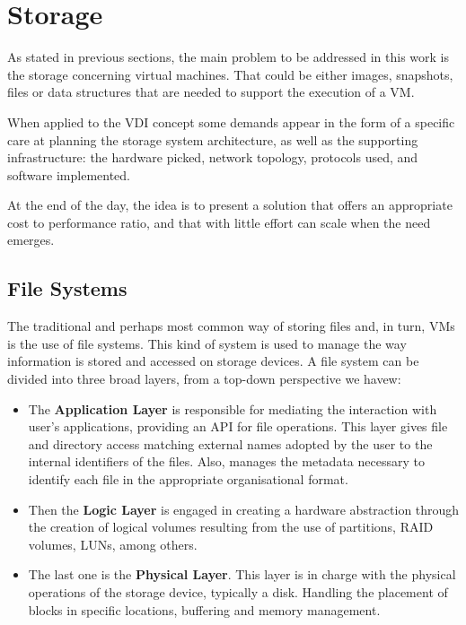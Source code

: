 

\section{Storage} %
\label{sec:storage}

As stated in previous sections, the main problem to be addressed in this work is the storage concerning virtual machines. That could be either images, snapshots, files or data structures that are needed to support the execution of a VM. 

When applied to the VDI concept some demands appear in the form of a specific care at planning the storage system architecture, as well as the supporting infrastructure: the hardware picked, network topology, protocols used, and software implemented.

At the end of the day, the idea is to present a solution that offers an appropriate cost to performance ratio, and that with little effort can scale when the need emerges.




\subsection{File Systems} %
\label{sub:file_systems}

The traditional and perhaps most common way of storing files and, in turn, VMs is the use of file systems.
This kind of system is used to manage the way information is stored and accessed on storage devices. A file system can be divided into three broad layers, from a top-down perspective we havew:

\begin{itemize}
	\item The \textbf{Application Layer} is responsible for mediating the interaction with user's applications, providing an API for file operations. This layer gives file and directory access matching external names adopted by the user to the internal identifiers of the files. Also, manages the metadata necessary to identify each file in the appropriate organisational format.
	\item Then the \textbf{Logic Layer} is engaged in creating a hardware abstraction through the creation of logical volumes resulting from the use of partitions, RAID volumes, LUNs, among others.
	\item The last one is the \textbf{Physical Layer}. This layer is in charge with the physical operations of the storage device, typically a disk. Handling the placement of blocks in specific locations, buffering and memory management.
\end{itemize}


